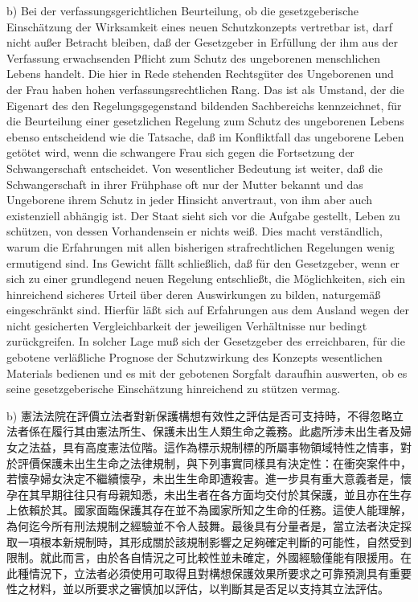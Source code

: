 \documentclass[12pt]{article}
\begin{document}
\begin{sourcepara}[title={原文D.69}]
b) Bei der verfassungsgerichtlichen Beurteilung, ob die gesetzgeberische Einschätzung der Wirksamkeit eines neuen Schutzkonzepts vertretbar ist, darf nicht außer Betracht bleiben, daß der Gesetzgeber in Erfüllung der ihm aus der Verfassung erwachsenden Pflicht zum Schutz des ungeborenen menschlichen Lebens handelt. Die hier in Rede stehenden Rechtsgüter des Ungeborenen und der Frau haben hohen verfassungsrechtlichen Rang. Das ist als Umstand, der die Eigenart des den Regelungsgegenstand bildenden Sachbereichs kennzeichnet, für die Beurteilung einer gesetzlichen Regelung zum Schutz des ungeborenen Lebens ebenso entscheidend wie die Tatsache, daß im Konfliktfall das ungeborene Leben getötet wird, wenn die schwangere Frau sich gegen die Fortsetzung der Schwangerschaft entscheidet. Von wesentlicher Bedeutung ist weiter, daß die Schwangerschaft in ihrer Frühphase oft nur der Mutter bekannt und das Ungeborene ihrem Schutz in jeder Hinsicht anvertraut, von ihm aber auch existenziell abhängig ist. Der Staat sieht sich vor die Aufgabe gestellt, Leben zu schützen, von dessen Vorhandensein er nichts weiß. Dies macht verständlich, warum die Erfahrungen mit allen bisherigen strafrechtlichen Regelungen wenig ermutigend sind. Ins Gewicht fällt schließlich, daß für den Gesetzgeber, wenn er sich zu einer grundlegend neuen Regelung entschließt, die Möglichkeiten, sich ein hinreichend sicheres Urteil über deren Auswirkungen zu bilden, naturgemäß eingeschränkt sind. Hierfür läßt sich auf Erfahrungen aus dem Ausland wegen der nicht gesicherten Vergleichbarkeit der jeweiligen Verhältnisse nur bedingt zurückgreifen. In solcher Lage muß sich der Gesetzgeber des erreichbaren, für die gebotene verläßliche Prognose der Schutzwirkung des Konzepts wesentlichen Materials bedienen und es mit der gebotenen Sorgfalt daraufhin auswerten, ob es seine gesetzgeberische Einschätzung hinreichend zu stützen vermag.
\end{sourcepara}
\begin{transpara}
b) 憲法法院在評價立法者對新保護構想有效性之評估是否可支持時，不得忽略立法者係在履行其由憲法所生、保護未出生人類生命之義務。此處所涉未出生者及婦女之法益，具有高度憲法位階。這作為標示規制標的所屬事物領域特性之情事，對於評價保護未出生生命之法律規制，與下列事實同樣具有決定性：在衝突案件中，若懷孕婦女決定不繼續懷孕，未出生生命即遭殺害。進一步具有重大意義者是，懷孕在其早期往往只有母親知悉，未出生者在各方面均交付於其保護，並且亦在生存上依賴於其。國家面臨保護其存在並不為國家所知之生命的任務。這使人能理解，為何迄今所有刑法規制之經驗並不令人鼓舞。最後具有分量者是，當立法者決定採取一項根本新規制時，其形成關於該規制影響之足夠確定判斷的可能性，自然受到限制。就此而言，由於各自情況之可比較性並未確定，外國經驗僅能有限援用。在此種情況下，立法者必須使用可取得且對構想保護效果所要求之可靠預測具有重要性之材料，並以所要求之審慎加以評估，以判斷其是否足以支持其立法評估。
\end{transpara}
\end{document}
